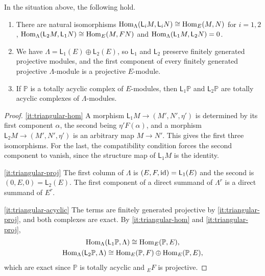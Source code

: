 \begin{lemma}
  \label{lemma:triangular}
  In the situation above, the following hold.
  \begin{enumerate}
    \item\label{it:triangular-hom} There are natural isomorphisms
      ${\Hom[\Lambda]{\mathsf{L}_iM}{\mathsf{L}_iN}}\cong{\Hom[E]{M}{N}}$ for
      ${i=1,2}$, ${\Hom[\Lambda]{\mathsf{L}_2M}{\mathsf{L}_1N}}\cong
      {\Hom[E]{M}{FN}}$ and ${\Hom[\Lambda]{\mathsf{L}_1M}{\mathsf{L}_2N}}={0}$.
    \item\label{it:triangular-proj} We have ${\Lambda=\mathsf{L}_1(E)\oplus
      \mathsf{L}_2(E)}$, so $\mathsf{L}_1$ and $\mathsf{L}_2$ preserve finitely
      generated projective modules, and the first component of every
      finitely generated projective $\Lambda$-module is a projective
      $E$-module.
    \item\label{it:triangular-acyclic} If $\mathbb{P}$ is a totally acyclic
      complex of $E$-modules, then $\mathsf{L}_1\mathbb{P}$ and
      $\mathsf{L}_2\mathbb{P}$ are totally acyclic complexes of
      $\Lambda$-modules.
  \end{enumerate}
\end{lemma}

\begin{proof}
  \eqref{it:triangular-hom} A morphism ${\mathsf{L}_1M\to(M',N',\eta')}$ is
  determined by its first component $\alpha$, the second being
  $\eta'F(\alpha)$, and a morphism ${\mathsf{L}_2M\to(M',N',\eta')}$ is an
  arbitrary map ${M\to N'}$. This gives the first three isomorphisms. For the
  last, the compatibility condition forces the second component to vanish,
  since the structure map of $\mathsf{L}_1M$ is the identity.

  \eqref{it:triangular-proj} The first column of $\Lambda$ is
  ${(E,F,\id)=\mathsf{L}_1(E)}$ and the second is ${(0,E,0)=\mathsf{L}_2(E)}$.
  The first component of a direct summand of $\Lambda^r$ is a direct summand of
  $E^r$.

  \eqref{it:triangular-acyclic} The terms are finitely generated projective by
  \eqref{it:triangular-proj}, and both complexes are exact. By
  \eqref{it:triangular-hom} and \eqref{it:triangular-proj},
  \begin{gather*}
    \Hom[\Lambda]{\mathsf{L}_1\mathbb{P}}{\Lambda}\cong\Hom[E]{\mathbb{P}}{E},\\
    \Hom[\Lambda]{\mathsf{L}_2\mathbb{P}}{\Lambda}\cong
    \Hom[E]{\mathbb{P}}{F}\oplus\Hom[E]{\mathbb{P}}{E},
  \end{gather*}
  which are exact since $\mathbb{P}$ is totally acyclic and ${}_EF$ is
  projective.
\end{proof}

